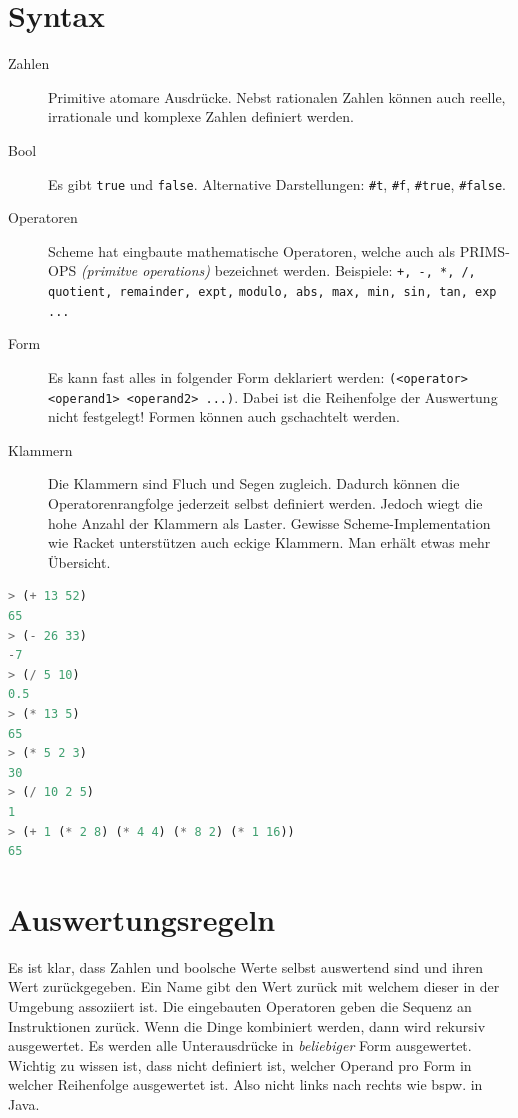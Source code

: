 \section{Syntax}
\begin{description}
	\item[Zahlen] Primitive atomare Ausdrücke. Nebst rationalen Zahlen können auch reelle, irrationale und komplexe Zahlen definiert werden.
	\item[Bool] Es gibt \verb|true| und \verb|false|. Alternative Darstellungen: \verb|#t|, \verb|#f|, \verb|#true|, \verb|#false|.
	\item[Operatoren] Scheme hat eingbaute mathematische Operatoren, welche auch als PRIMS-OPS \emph{(primitve operations)} bezeichnet werden. Beispiele: \verb|+, -, *, /, quotient, remainder, expt,| \verb|modulo, abs, max, min, sin, tan, exp ...|
	\item[Form] Es kann fast alles in folgender Form deklariert werden: \verb|(<operator> <operand1> <operand2> ...)|. Dabei ist die Reihenfolge der Auswertung nicht festgelegt! Formen können auch gschachtelt werden.
	\item[Klammern] Die Klammern sind Fluch und Segen zugleich. Dadurch können die Operatorenrangfolge jederzeit selbst definiert werden. Jedoch wiegt die hohe Anzahl der Klammern als Laster. Gewisse Scheme-Implementation wie Racket unterstützen auch eckige Klammern. Man erhält etwas mehr Übersicht.
\end{description}

\begin{lstlisting}[language=Lisp, caption=Simple mathematische Operationen]
> (+ 13 52)
65
> (- 26 33)
-7
> (/ 5 10)
0.5
> (* 13 5)
65
> (* 5 2 3)
30
> (/ 10 2 5)
1
> (+ 1 (* 2 8) (* 4 4) (* 8 2) (* 1 16))
65
\end{lstlisting}

\section{Auswertungsregeln}
Es ist klar, dass Zahlen und boolsche Werte selbst auswertend sind und ihren Wert zurückgegeben. Ein Name gibt den Wert zurück mit welchem dieser in der Umgebung assoziiert ist. Die eingebauten Operatoren geben die Sequenz an Instruktionen zurück.
Wenn die Dinge kombiniert werden, dann wird rekursiv ausgewertet. Es werden alle Unterausdrücke in \emph{beliebiger} Form ausgewertet. Wichtig zu wissen ist, dass nicht definiert ist, welcher Operand pro Form in welcher Reihenfolge ausgewertet ist. Also nicht links nach rechts wie bspw. in Java.

